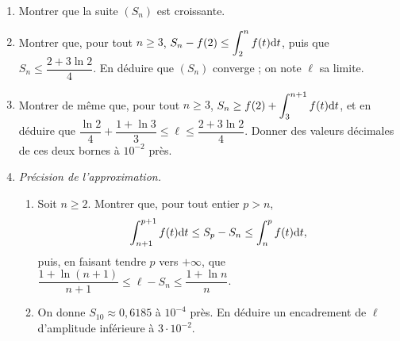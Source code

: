 \begin{exo}
\begin{description}
\begin{enumerate}
                              \[
                                    f(k+1) \leq \int_k^{k+1} f(t) \dt \leq f(k) .
                              \]
                        \item Montrer que la suite $(S_n)$ est croissante.
                        \item Montrer que, pour tout $n \geq 3$, $\displaystyle S_n - f(2) \leq \int_2^n f(t) \mathrm{d}t$,
                              puis que $S_n \leq \dfrac{2 + 3 \ln 2}{4}$.
                              En d\'eduire que $(S_n)$ converge ; on note $\ell$ sa limite.
                        \item Montrer de m\^eme que, pour tout $n \geq 3$,
                              $\displaystyle S_n \geq f(2) + \int_3^{n+1} f(t) \mathrm{d}t$, et en d\'eduire que
                              $\dfrac{\ln 2}{4} + \dfrac{1 + \ln 3}{3} \leq \ell \leq \dfrac{2 + 3\ln 2}{4}$.
                              Donner des valeurs d\'ecimales de ces deux bornes \`a $10^{-2}$ pr\`es.
                        \item \emph{Pr\'ecision de l'approximation.}
                              \begin{enumerate}
                                    \item Soit $n \geq 2$. Montrer que, pour tout entier $p > n$,
                                          \[
                                                \int_{n+1}^{p+1} f(t) \mathrm{d}t \leq S_p - S_n \leq \int_n^p f(t) \mathrm{d}t ,
                                          \]
                                          puis, en faisant tendre $p$ vers $+\infty$, que
                                          $\dfrac{1 + \ln (n+1)}{n+1} \leq \ell - S_n \leq \dfrac{1 + \ln n}{n}$.
                                    \item On donne $S_{10} \approx 0{,}6185$ \`a $10^{-4}$ pr\`es.
                                          En d\'eduire un encadrement de $\ell$ d'amplitude inf\'erieure \`a $3 \cdot 10^{-2}$.
                              \end{enumerate}
                  \end{enumerate}
      \end{description}
\end{exo}
